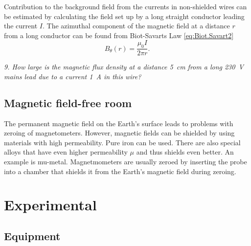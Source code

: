 \documentclass[../Elmag-labhefte-2020.tex]{subfiles}
\begin{document}
Contribution to the background field from the currents in non-shielded wires can be estimated by calculating the field set up by a long straight conductor leading the current $I$. The azimuthal component of the magnetic field at a distance $r$ from a long conductor can be found from  Biot-Savarts Law \eqref{eq:Biot.Savart2}
\begin{equation}
    B_\theta (r) = \frac{\mu_0 I}{2\pi r} .
\end{equation}

\emph{9. How large is the magnetic flux density at a distance \SI{5}{\cm} from a long \SI{230}{\volt} mains lead due to a current \SI{1}{\ampere} in this wire?}

\subsection{Magnetic field-free room \label{ch.mymetall}}

The permanent magnetic field on the Earth's surface leads to problems with zeroing of magnetometers. However, magnetic fields can be shielded by using materials with high permeability. Pure iron can be used. There are also special alloys that have even higher permeability $\mu$ and thus shields even better. An example is mu-metal. Magnetmometers are usually zeroed by inserting the probe into a chamber that shields it from the Earth's magnetic field during zeroing.


\section{Experimental \label{ch.magnetfelt.eksperimentelt}}

\subsection{Equipment}
\end{document}
